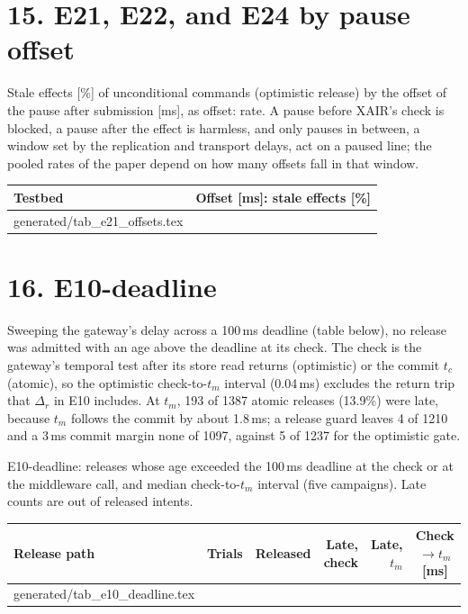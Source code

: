 \documentclass[11pt]{article}
\makeatletter
\newcommand{\gen}[1]{\@@input generated/#1.tex }
\makeatother
\begin{document}
\section*{15. E21, E22, and E24 by pause offset}
Stale effects [\%] of unconditional commands (optimistic release) by the offset of the pause after submission [ms], as offset: rate. A pause before XAIR's check is blocked, a pause after the effect is harmless, and only pauses in between, a window set by the replication and transport delays, act on a paused line; the pooled rates of the paper depend on how many offsets fall in that window.
\begin{center}\small
\begin{tabularx}{\linewidth}{@{}lX@{}}
\toprule
\textbf{Testbed} & \textbf{Offset [ms]: stale effects [\%]} \\
\midrule
\gen{tab_e21_offsets}
\bottomrule
\end{tabularx}
\end{center}

\section*{16. E10-deadline}
Sweeping the gateway's delay across a 100\,ms deadline (table below), no release was admitted with an age above the deadline at its check. The check is the gateway's temporal test after its store read returns (optimistic) or the commit $t_c$ (atomic), so the optimistic check-to-$t_m$ interval (0.04\,ms) excludes the return trip that $\Delta_r$ in E10 includes. At $t_m$, 193 of 1387 atomic releases (13.9\%) were late, because $t_m$ follows the commit by about 1.8\,ms; a release guard leaves 4 of 1210 and a 3\,ms commit margin none of 1097, against 5 of 1237 for the optimistic gate.

\noindent E10-deadline: releases whose age exceeded the 100\,ms deadline at the check or at the middleware call, and median check-to-$t_m$ interval (five campaigns). Late counts are out of released intents.
\begin{center}
\footnotesize
\setlength{\tabcolsep}{4pt}
\begin{tabular}{@{}lrrrrc@{}}
\toprule
\textbf{Release path} & \textbf{Trials} & \textbf{Released} & \textbf{Late, check} & \textbf{Late, $t_m$} & \textbf{Check$\to t_m$ [ms]} \\
\midrule
\gen{tab_e10_deadline}
\bottomrule
\end{tabular}
\end{center}
\end{document}
